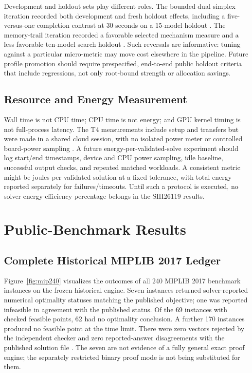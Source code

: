 \documentclass[10pt,a4paper,twocolumn]{article}
\begin{document}
Development and holdout sets play different roles. The bounded dual simplex iteration recorded both development and fresh holdout effects, including a five-versus-one completion contrast at 30 seconds on a 15-model holdout \cite{iter30}. The memory-trail iteration recorded a favorable selected mechanism measure and a less favorable ten-model search holdout \cite{iter33}. Such reversals are informative: tuning against a particular micro-metric may move cost elsewhere in the pipeline. Future profile promotion should require prespecified, end-to-end public holdout criteria that include regressions, not only root-bound strength or allocation savings.

\subsection{Resource and Energy Measurement}

Wall time is not CPU time; CPU time is not energy; and GPU kernel timing is not full-process latency. The T4 measurements include setup and transfers but were made in a shared cloud session, with no isolated power meter or controlled board-power sampling \cite{gpu03}. A future energy-per-validated-solve experiment should log start/end timestamps, device and CPU power sampling, idle baseline, successful output checks, and repeated matched workloads. A consistent metric might be joules per validated solution at a fixed tolerance, with total energy reported separately for failures/timeouts. Until such a protocol is executed, no solver energy-efficiency percentage belongs in the SIH26119 results.

\section{Public-Benchmark Results}\label{sec:results}

\subsection{Complete Historical MIPLIB 2017 Ledger}

Figure~\ref{fig:mip240} visualizes the outcomes of all 240 MIPLIB 2017 benchmark instances on the frozen historical engine. Seven instances returned solver-reported numerical optimality statuses matching the published objective; one was reported infeasible in agreement with the published status. Of the 69 instances with checked feasible points, 62 had no optimality conclusion. A further 170 instances produced no feasible point at the time limit. There were zero vectors rejected by the independent checker and zero reported-answer disagreements with the published solution file \cite{mip240}. The seven are not evidence of a fully general exact proof engine; the separately restricted binary proof mode is not being substituted for them.
\end{document}
